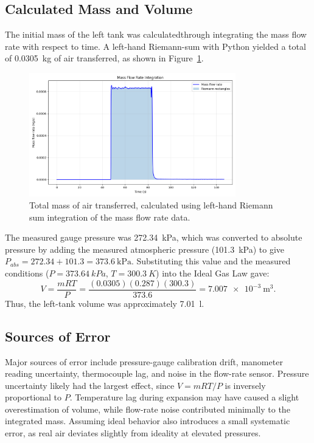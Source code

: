 \documentclass[12pt]{article}
\begin{document}
\subsection*{Calculated Mass and Volume}

The initial mass of the left tank was calculatedthrough integrating the mass flow rate with respect to time. A left-hand Riemann-sum with Python \cite{integrate_script} yielded a total of \SI{0.0305}{\kilogram} of air transferred, as shown in Figure~\ref{fig:massintegration}.
\begin{figure}[h!]
\centering
\includegraphics[width=0.8\textwidth]{massintegration.png}
\caption{Total mass of air transferred, calculated using left-hand Riemann sum integration of the mass flow rate data.}
\label{fig:massintegration}
\end{figure}
The measured gauge pressure was \SI{272.34}{\kPa}, which was converted to absolute pressure by adding the measured atmospheric pressure (\SI{101.3}{\kPa}) to give \(P_{abs} = 272.34 + 101.3 = \SI{373.6}{\kPa}\). Substituting this value and the measured conditions (\(P = 373.64~\si{kPa}\), \(T = 300.3~\si{K}\)) into the Ideal Gas Law gave:
\[
V = \frac{mRT}{P} =
\frac{(0.0305)(0.287)(300.3)}{373.6} = \SI{7.007e-3}{\metre\cubed}.
\]
Thus, the left-tank volume was approximately \SI{7.01}{\litre}.


\subsection*{Sources of Error}

Major sources of error include pressure-gauge calibration drift, manometer reading uncertainty, 
thermocouple lag, and noise in the flow-rate sensor. 
Pressure uncertainty likely had the largest effect, since \(V = mRT/P\) is inversely proportional to \(P\). 
Temperature lag during expansion may have caused a slight overestimation of volume, 
while flow-rate noise contributed minimally to the integrated mass. 
Assuming ideal behavior also introduces a small systematic error, 
as real air deviates slightly from ideality at elevated pressures. 
\end{document}
